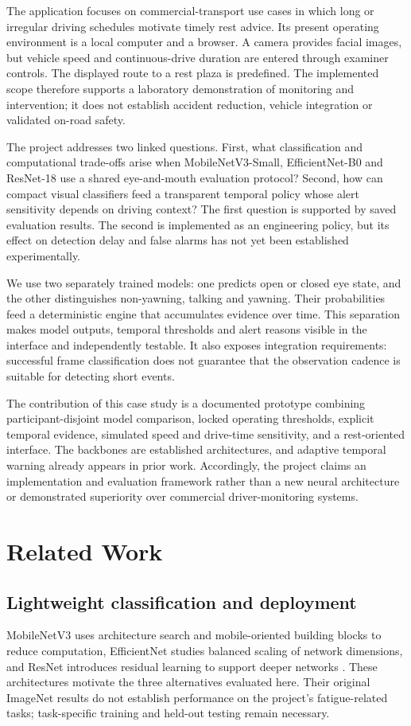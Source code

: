 \documentclass[pdflatex,sn-mathphys-num]{sn-jnl}
\begin{document}
The application focuses on commercial-transport use cases in which long or irregular driving schedules motivate timely rest advice. Its present operating environment is a local computer and a browser. A camera provides facial images, but vehicle speed and continuous-drive duration are entered through examiner controls. The displayed route to a rest plaza is predefined. The implemented scope therefore supports a laboratory demonstration of monitoring and intervention; it does not establish accident reduction, vehicle integration or validated on-road safety.

The project addresses two linked questions. First, what classification and computational trade-offs arise when MobileNetV3-Small, EfficientNet-B0 and ResNet-18 use a shared eye-and-mouth evaluation protocol? Second, how can compact visual classifiers feed a transparent temporal policy whose alert sensitivity depends on driving context? The first question is supported by saved evaluation results. The second is implemented as an engineering policy, but its effect on detection delay and false alarms has not yet been established experimentally.

We use two separately trained models: one predicts open or closed eye state, and the other distinguishes non-yawning, talking and yawning. Their probabilities feed a deterministic engine that accumulates evidence over time. This separation makes model outputs, temporal thresholds and alert reasons visible in the interface and independently testable. It also exposes integration requirements: successful frame classification does not guarantee that the observation cadence is suitable for detecting short events.

The contribution of this case study is a documented prototype combining participant-disjoint model comparison, locked operating thresholds, explicit temporal evidence, simulated speed and drive-time sensitivity, and a rest-oriented interface. The backbones are established architectures, and adaptive temporal warning already appears in prior work. Accordingly, the project claims an implementation and evaluation framework rather than a new neural architecture or demonstrated superiority over commercial driver-monitoring systems.

\section{Related Work}\label{sec:related}
\subsection{Lightweight classification and deployment}
MobileNetV3 uses architecture search and mobile-oriented building blocks to reduce computation, EfficientNet studies balanced scaling of network dimensions, and ResNet introduces residual learning to support deeper networks \cite{howard2019mobilenetv3,tan2019efficientnet,he2016resnet}. These architectures motivate the three alternatives evaluated here. Their original ImageNet results do not establish performance on the project's fatigue-related tasks; task-specific training and held-out testing remain necessary.
\end{document}
